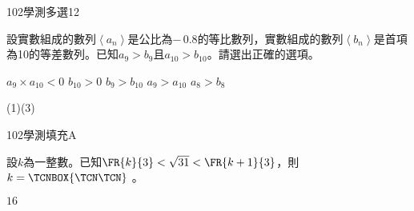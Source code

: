     \begin{QUESTION}
        \begin{ExamInfo}{102}{學測}{多選}{12}
        \end{ExamInfo}
        \begin{ExamAnsRateInfo}{45}{67}{46}{22}
        \end{ExamAnsRateInfo}
        \begin{QBODY}
            設實數組成的數列$\left\langle {{a}_{n}} \right\rangle $是公比為$-\,0.8$的等比數列，實數組成的數列$\left\langle {{b}_{n}} \right\rangle $是首項為10的等差數列。已知${{a}_{9}}>{{b}_{9}}$且${{a}_{10}}>{{b}_{10}}$。請選出正確的選項。
			\begin{QOPS}
				\QOP ${{a}_{9}}\times {{a}_{10}}<0$
				\QOP ${{b}_{10}}>0$
				\QOP ${{b}_{9}}>{{b}_{10}}$
				\QOP ${{a}_{9}}>{{a}_{10}}$
				\QOP ${{a}_{8}}>{{b}_{8}}$
			\end{QOPS}
        \end{QBODY}
        \begin{QFROMS}
        \end{QFROMS}
        \begin{QTAGS}\end{QTAGS}
        \begin{QANS}
            (1)(3)
        \end{QANS}
        \begin{QSOLLIST}
        \end{QSOLLIST}
        \begin{QEMPTYSPACE}
        \end{QEMPTYSPACE}
    \end{QUESTION}
    \begin{QUESTION}
        \begin{ExamInfo}{102}{學測}{填充}{A}
        \end{ExamInfo}
        \begin{ExamAnsRateInfo}{68}{95}{82}{27}
        \end{ExamAnsRateInfo}
        \begin{QBODY}
            設$k$為一整數。已知$\FR{k}{3}<\sqrt{31}<\FR{k+1}{3}$，則$k= \TCNBOX{\TCN\TCN}$        。
        \end{QBODY}
        \begin{QFROMS}
        \end{QFROMS}
        \begin{QTAGS}\end{QTAGS}
        \begin{QANS}
            $16$
        \end{QANS}
        \begin{QSOLLIST}
        \end{QSOLLIST}
        \begin{QEMPTYSPACE}
        \end{QEMPTYSPACE}
    \end{QUESTION}
